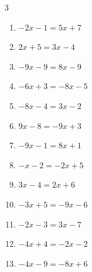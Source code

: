 \begin{multicols}{3}
\begin{enumerate}

  \item $-2x-1=5x+7$


  \item $2x+5=3x-4$

        \phantom{$\displaystyle x=9$}

  \item $-9x-9=8x-9$

        \phantom{$\displaystyle x=0$}

  \item $-6x+3=-8x-5$

        \phantom{$\displaystyle x=-4$}

\columnbreak %

\resetques

  \item $-8x-4=3x-2$


  \item $9x-8=-9x+3$


  \item $-9x-1=8x+1$


  \item $-x-2=-2x+5$

        \phantom{$\displaystyle x=7$}

  \item $3x-4=2x+6$

        \phantom{$\displaystyle x=10$}

  \item $-3x+5=-9x-6$


  \item $-2x-3=3x-7$


  \item $-4x+4=-2x-2$

        \phantom{$\displaystyle x=3$}

  \item $-4x-9=-8x+6$



\end{enumerate}
\end{multicols}
